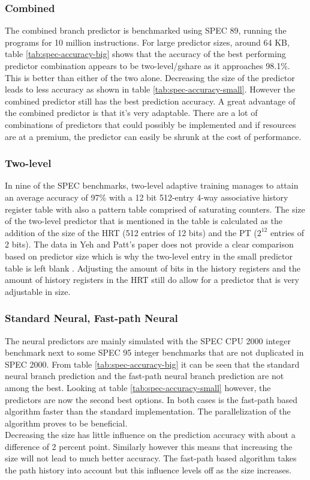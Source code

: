 \subsubsection*{Combined}
The combined branch predictor is benchmarked using SPEC 89, running the programs for 10 million instructions.
For large predictor sizes, around 64 KB, table \ref{tab:spec-accuracy-big} shows that the accuracy of the best performing predictor combination appears to be two-level/gshare as it approaches 98.1\%. This is better than either of the two alone. Decreasing the size of the predictor leads to less accuracy as shown in table \ref{tab:spec-accuracy-small}. However the combined predictor still has the best prediction accuracy. A great advantage of the combined predictor is that it's very adaptable. There are a lot of combinations of predictors that could possibly be implemented and if resources are at a premium, the predictor can easily be shrunk at the cost of performance.

\subsubsection*{Two-level}
In nine of the SPEC benchmarks, two-level adaptive training manages to attain an average accuracy of 97\% with a 12 bit 512-entry 4-way associative history register table with also a pattern table comprised of saturating counters. 
The size of the two-level predictor that is mentioned in the table is calculated as the addition of the size of the HRT (512 entries of 12 bits) and the PT ($2^{12}$ entries of 2 bits). 
The data in Yeh and Patt's paper does not provide a clear comparison based on predictor size which is why the two-level entry in the small predictor table is left blank \cite{twolevel}. 
Adjusting the amount of bits in the history registers and the amount of history registers in the HRT still do allow for a predictor that is very adjustable in size.

\subsubsection*{Standard Neural, Fast-path Neural}
The neural predictors are mainly simulated with the SPEC CPU 2000 integer benchmark next to some SPEC 95 integer benchmarks that are not duplicated in SPEC 2000. From table \ref{tab:spec-accuracy-big} it can be seen that the standard neural branch prediction and the fast-path neural branch prediction are not among the best. Looking at table \ref{tab:spec-accuracy-small} however, the predictors are now the second best options. In both cases is the fast-path based algorithm faster than the standard implementation. The parallelization of the algorithm proves to be beneficial. \\
Decreasing the size has little influence on the prediction accuracy with about a difference of 2 percent point. Similarly however this means that increasing the size will not lead to much better accuracy. The fast-path based algorithm takes the path history into account but this influence levels off as the size increases.

